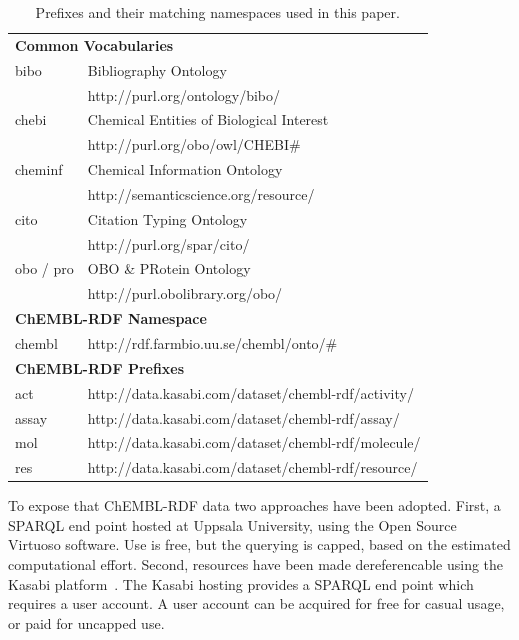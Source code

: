 \documentclass[10pt]{bmc_article}
\newenvironment{bmcformat}{\begin{raggedright}\baselineskip20pt\sloppy\setboolean{publ}{false}}{\end{raggedright}\baselineskip20pt\sloppy}
\begin{document}
\begin{bmcformat}
\begin{table}
\caption{Prefixes and their matching namespaces used in this paper.} \label{namespaces}
\begin{center}
\begin{tabular}{ll}
\hline
\multicolumn{2}{l}{\textbf{Common Vocabularies}} \\
bibo    & Bibliography Ontology~\cite{Giasson2011} \\
        & http://purl.org/ontology/bibo/ \\
chebi   & Chemical Entities of Biological Interest~\cite{DeMatos2010} \\
        & http://purl.org/obo/owl/CHEBI\# \\
cheminf & Chemical Information Ontology~\cite{Hastings2011} \\
        & http://semanticscience.org/resource/ \\
cito    & Citation Typing Ontology~\cite{Shotton2010} \\
        & http://purl.org/spar/cito/ \\
obo / pro & OBO \& PRotein Ontology~\cite{Sidhu2006} \\
          & http://purl.obolibrary.org/obo/ \\

\multicolumn{2}{l}{\textbf{ChEMBL-RDF Namespace}} \\
chembl & http://rdf.farmbio.uu.se/chembl/onto/\# \\

\multicolumn{2}{l}{\textbf{ChEMBL-RDF Prefixes }}\\
act    & http://data.kasabi.com/dataset/chembl-rdf/activity/ \\
assay  & http://data.kasabi.com/dataset/chembl-rdf/assay/ \\
mol    & http://data.kasabi.com/dataset/chembl-rdf/molecule/ \\
res    & http://data.kasabi.com/dataset/chembl-rdf/resource/ \\
\hline
\end{tabular}
\end{center}
\end{table}

To expose that ChEMBL-RDF data two approaches have been adopted. First, a SPARQL end point
hosted at Uppsala University, using the Open Source Virtuoso software. Use is free, but the
querying is capped, based on the estimated computational effort. Second, resources have
been made dereferencable using the Kasabi platform~\cite{kasabi}. The Kasabi hosting provides a SPARQL
end point which requires a user account. A user account can be acquired for free for casual usage,
or paid for uncapped  use.


\end{bmcformat}
\end{document}
